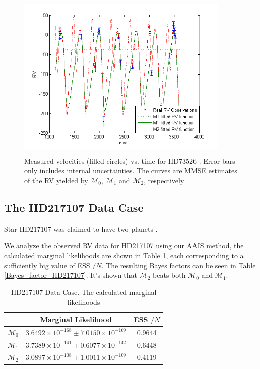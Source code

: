 \documentclass[aoas]{imsart}
\def\ESS{\textsf{ESS }}
\begin{document}
\begin{figure}[!htb]
\centerline{\includegraphics[width=4in,height=3.2in]{Fig/rv_comparison_data2.png}}
\caption{Measured velocities (filled circles) vs. time for HD73526
\cite{tinney20062}. Error bars only includes internal uncertainties.
The curves are MMSE estimates of the RV yielded by $\mathcal{M}_0$,
$\mathcal{M}_1$ and $\mathcal{M}_2$,
respectively}\label{fig:rv_comparison_data2}
\end{figure}

\subsection{The HD217107 Data Case}
Star HD217107 was claimed to have two planets \citep{vogt2005five}.

We analyze the observed RV data for HD217107 using our AAIS method,
the calculated marginal likelihoods are shown in Table
\ref{marginal_likelihood_HD217107}, each corresponding to a
sufficiently big value of \ESS$/N$. The resulting Bayes factors can
be seen in Table \ref{Bayes_factor_HD217107}. It's shown that
$\mathcal{M}_2$ beats both $\mathcal{M}_0$ and $\mathcal{M}_1$.

\begin{table}
\begin{tabular}{c|c|c}
 & Marginal Likelihood & \ESS$/N$\\
\hline $\mathcal{M}_0$ & $3.6492\times10^{-168}\pm7.0150\times10^{-169}$ & 0.9644\\
\hline $\mathcal{M}_1$ & $3.7389\times10^{-141}\pm0.6077\times10^{-142}$ & 0.6448\\
\hline $\mathcal{M}_2$ & $3.0897\times10^{-108}\pm1.0011\times10^{-109}$ & 0.4119 \\
\hline
\end{tabular}
\caption{HD217107 \citep{vogt2005five} Data Case. The calculated
marginal likelihoods}\label{marginal_likelihood_HD217107}
\end{table}
\end{document}
